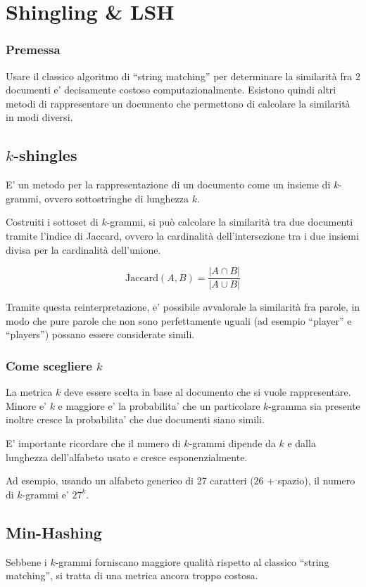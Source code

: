\chapter{Shingling \& LSH}

		\subsection*{Premessa}
			Usare il classico algoritmo di ``string matching'' per determinare la similarità fra 2 documenti e' decisamente costoso computazionalmente. Esistono quindi altri metodi di rappresentare un documento che permettono di calcolare la similarità in modi diversi.

	\section{$k$-shingles}
		E' un metodo per la rappresentazione di un documento come un insieme di $k$-grammi, ovvero sottostringhe di lunghezza $k$.

		Costruiti i sottoset di $k$-grammi, si può calcolare la similarità tra due documenti tramite l'indice di Jaccard, ovvero la cardinalità dell'intersezione tra i due insiemi divisa per la cardinalità dell'unione.

		$$
		\text{Jaccard}(A, B) = \frac{|A \cap B|}{|A \cup B|}
		$$

		Tramite questa reinterpretazione, e' possibile avvalorale la similarità fra parole, in modo che pure parole che non sono perfettamente uguali (ad esempio ``player'' e ``players'') possano essere considerate simili.

			\subsection{Come scegliere $k$}
				La metrica $k$ deve essere scelta in base al documento che si vuole rappresentare. Minore e' $k$ e maggiore e' la probabilita' che un particolare $k$-gramma sia presente inoltre cresce la probabilita' che due documenti siano simili.

				E' importante ricordare che il numero di $k$-grammi dipende da $k$ e dalla lunghezza dell'alfabeto usato e cresce esponenzialmente.

				Ad esempio, usando un alfabeto generico di 27 caratteri (26 + spazio), il numero di $k$-grammi e' $27^k$.

	\section{Min-Hashing}
		Sebbene i $k$-grammi forniscano maggiore qualità rispetto al classico ``string matching'', si tratta di una metrica ancora troppo costosa.

